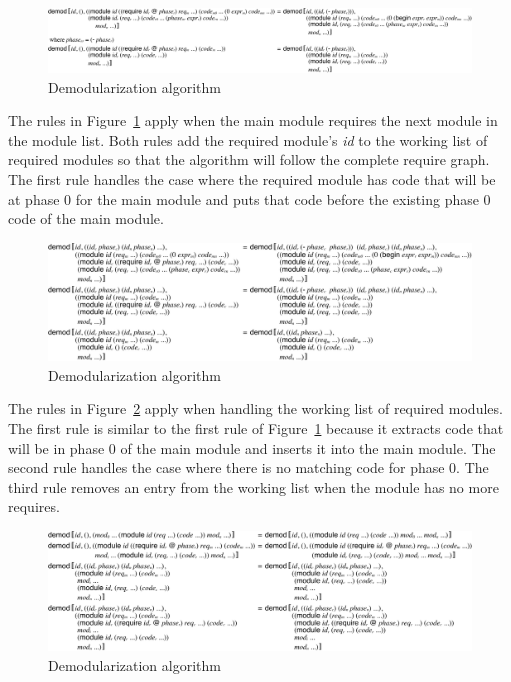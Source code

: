 \begin{figure}[!h]
\includegraphics[width=\textwidth]{figures/demod-redex1}
\caption{Demodularization algorithm}
\label{fig:demod-redex1}
\end{figure}
The rules in Figure~\ref{fig:demod-redex1} apply when the main module requires the next module in the module list.
Both rules add the required module's \emph{id} to the working list of required modules so that the algorithm will follow the complete require graph.
The first rule handles the case where the required module has code that will be at phase 0 for the main module and puts that code before the existing phase 0 code of the main module.
\begin{figure}[!h]
\includegraphics[width=\textwidth]{figures/demod-redex2}
\caption{Demodularization algorithm}
\label{fig:demod-redex2}
\end{figure}
The rules in Figure~\ref{fig:demod-redex2} apply when handling the working list of required modules. 
The first rule is similar to the first rule of Figure~\ref{fig:demod-redex1} because it extracts code that will be in phase 0 of the main module and inserts it into the main module.
The second rule handles the case where there is no matching code for phase 0.
The third rule removes an entry from the working list when the module has no more requires.

\begin{figure}[!h]
\includegraphics[width=\textwidth]{figures/demod-redex3}
\caption{Demodularization algorithm}
\label{fig:demod-redex3}
\end{figure}

